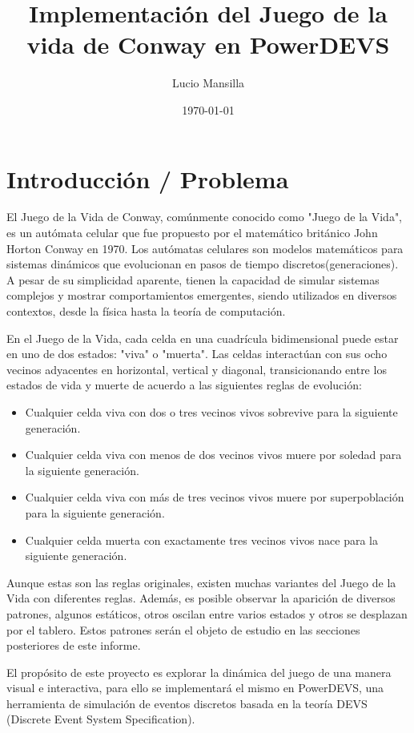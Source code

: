 \documentclass[]{article}
\title{\textbf{Implementación del Juego de la vida de Conway en PowerDEVS}}
\author{Lucio Mansilla}
\date{\today}
\begin{document}
\maketitle


\section{Introducción / Problema}
El Juego de la Vida de Conway, comúnmente conocido como "Juego de la Vida", es un autómata celular que fue propuesto por el matemático británico John Horton Conway en 1970. Los autómatas celulares son modelos matemáticos para sistemas dinámicos que evolucionan en pasos de tiempo discretos(generaciones). A pesar de su simplicidad aparente, tienen la capacidad de simular sistemas complejos y mostrar comportamientos emergentes, siendo utilizados en diversos contextos, desde la física hasta la teoría de computación.

En el Juego de la Vida, cada celda en una cuadrícula bidimensional puede estar en uno de dos estados: "viva" o "muerta". Las celdas interactúan con sus ocho vecinos adyacentes en horizontal, vertical y diagonal, transicionando entre los estados de vida y muerte de acuerdo a las siguientes reglas de evolución:

\begin{itemize}
\item Cualquier celda viva con dos o tres vecinos vivos sobrevive para la siguiente generación.
\item Cualquier celda viva con menos de dos vecinos vivos muere por soledad para la siguiente generación.
\item Cualquier celda viva con más de tres vecinos vivos muere por superpoblación para la siguiente generación.
\item Cualquier celda muerta con exactamente tres vecinos vivos nace para la siguiente generación.
\end{itemize}

Aunque estas son las reglas originales, existen muchas variantes del Juego de la Vida con diferentes reglas. Además, es posible observar la aparición de diversos patrones, algunos  estáticos, otros oscilan entre varios estados y otros se desplazan por el tablero. Estos patrones serán el objeto de estudio en las secciones posteriores de este informe.

El propósito de este proyecto es explorar la dinámica del juego de una manera visual e interactiva, para ello se implementará el mismo en PowerDEVS, una herramienta de simulación de eventos discretos basada en la teoría DEVS (Discrete Event System Specification).
\end{document}
